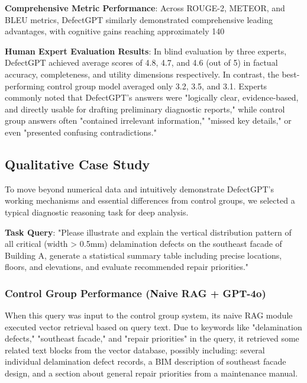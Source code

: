 \textbf{Comprehensive Metric Performance}: Across ROUGE-2, METEOR, and BLEU metrics, DefectGPT similarly demonstrated comprehensive leading advantages, with cognitive gains reaching approximately 140%

\textbf{Human Expert Evaluation Results}: In blind evaluation by three experts, DefectGPT achieved average scores of 4.8, 4.7, and 4.6 (out of 5) in factual accuracy, completeness, and utility dimensions respectively. In contrast, the best-performing control group model averaged only 3.2, 3.5, and 3.1. Experts commonly noted that DefectGPT's answers were "logically clear, evidence-based, and directly usable for drafting preliminary diagnostic reports," while control group answers often "contained irrelevant information," "missed key details," or even "presented confusing contradictions."

\subsection{Qualitative Case Study}

To move beyond numerical data and intuitively demonstrate DefectGPT's working mechanisms and essential differences from control groups, we selected a typical diagnostic reasoning task for deep analysis.

\textbf{Task Query}: "Please illustrate and explain the vertical distribution pattern of all critical (width > 0.5mm) delamination defects on the southeast facade of Building A, generate a statistical summary table including precise locations, floors, and elevations, and evaluate recommended repair priorities."

\subsubsection{Control Group Performance (Naive RAG + GPT-4o)}

When this query was input to the control group system, its naive RAG module executed vector retrieval based on query text. Due to keywords like "delamination defects," "southeast facade," and "repair priorities" in the query, it retrieved some related text blocks from the vector database, possibly including: several individual delamination defect records, a BIM description of southeast facade design, and a section about general repair priorities from a maintenance manual.

